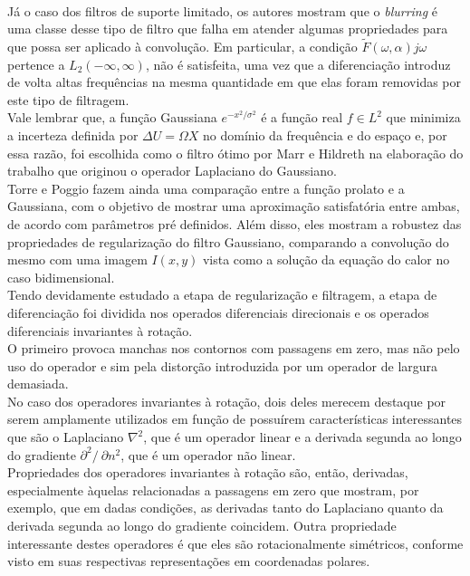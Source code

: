 \begin{enumerate}
\begin{enumerate}[label*=\arabic*.]
    \\[6pt]
    Já o caso dos filtros de suporte limitado, os autores mostram que o \textit{blurring} é uma classe desse tipo de filtro que falha em atender algumas propriedades para que possa ser aplicado à convolução. Em particular, a condição $\tilde{F}(\omega, \alpha) j\omega$ pertence a $L_{2}(-\infty, \infty)$, não é satisfeita, uma vez que a diferenciação introduz de volta altas frequências na mesma quantidade em que elas foram removidas por este tipo de filtragem.
    \\[6pt]
    Vale lembrar que, a função Gaussiana $e^{-x^2/\sigma^2}$ é a função real $f \in L^2$ que minimiza a incerteza definida por $\Delta U = \Omega X$ no domínio da frequência e do espaço e, por essa razão, foi escolhida como o filtro ótimo por Marr e Hildreth na elaboração do trabalho que originou o operador Laplaciano do Gaussiano.
    \\[6pt]
    Torre e Poggio fazem ainda uma comparação entre a função prolato e a Gaussiana, com o objetivo de mostrar uma aproximação satisfatória entre ambas, de acordo com parâmetros pré definidos. Além disso, eles mostram a robustez das propriedades de regularização do filtro Gaussiano, comparando a convolução do mesmo com uma imagem $I(x, y)$ vista como a solução da equação do calor no caso bidimensional.
    \\[6pt]
    Tendo devidamente estudado a etapa de regularização e filtragem, a etapa de diferenciação foi dividida nos operados diferenciais direcionais e os operados diferenciais invariantes à rotação.
    \\[6pt]
    O primeiro provoca manchas nos contornos com passagens em zero, mas não pelo uso do operador e sim pela distorção introduzida por um operador de largura demasiada.
    \\[6pt]
    No caso dos operadores invariantes à rotação, dois deles merecem destaque por serem amplamente utilizados em função de possuírem características interessantes que são o Laplaciano $\nabla ^2$, que é um operador linear e a derivada segunda ao longo do gradiente $\partial^2 /\ \partial n^2$, que é um operador não linear.
    \\[6pt]
    Propriedades dos operadores invariantes à rotação são, então, derivadas, especialmente àquelas relacionadas a passagens em zero que mostram, por exemplo, que em dadas condições, as derivadas tanto do Laplaciano quanto da derivada segunda ao longo do gradiente coincidem. Outra propriedade interessante destes operadores é que eles são rotacionalmente simétricos, conforme visto em suas respectivas representações em coordenadas polares.

\end{enumerate}
\end{enumerate}
